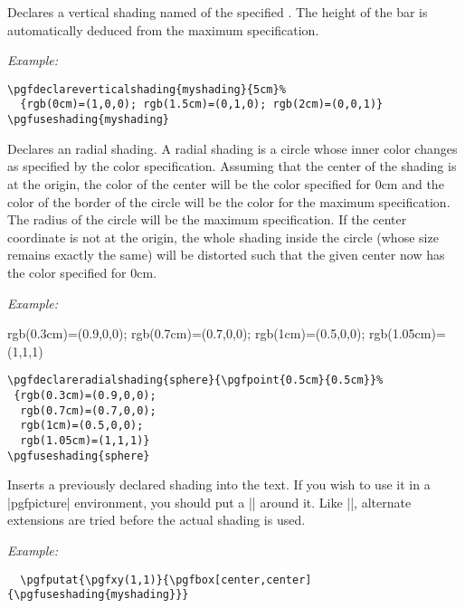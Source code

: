 \documentclass{ltxdoc}
\def\example{\par\smallskip\noindent\textit{Example: }}
\begin{document}
\begin{command}{\pgfdeclareverticalshading{}}
   Declares a vertical shading named  of the
   specified . The height of the bar is automatically
   deduced from the maximum specification.
  \example


\begin{verbatim}
\pgfdeclareverticalshading{myshading}{5cm}%
  {rgb(0cm)=(1,0,0); rgb(1.5cm)=(0,1,0); rgb(2cm)=(0,0,1)}
\pgfuseshading{myshading}
\end{verbatim}
\end{command}


\begin{command}{\pgfdeclareradialshading{}}
  Declares an radial shading. A radial shading is a circle whose inner
  color changes as specified by the color specification. Assuming that
  the center of the shading is at the origin, the color of the center
  will be the color specified for 0cm and the color of the border of
  the circle will be the color for the maximum specification. The
  radius of the circle will be the maximum specification. If the
  center coordinate is not at the origin, the whole shading inside the
  circle (whose size remains exactly the same) will be distorted such
  that the given center now has the color specified for 0cm.
  \example

%
 {rgb(0.3cm)=(0.9,0,0); rgb(0.7cm)=(0.7,0,0); rgb(1cm)=(0.5,0,0); rgb(1.05cm)=(1,1,1)}

\begin{verbatim}
\pgfdeclareradialshading{sphere}{\pgfpoint{0.5cm}{0.5cm}}%
 {rgb(0.3cm)=(0.9,0,0);
  rgb(0.7cm)=(0.7,0,0);
  rgb(1cm)=(0.5,0,0);
  rgb(1.05cm)=(1,1,1)}
\pgfuseshading{sphere}
\end{verbatim}
\end{command}

\begin{command}{\pgfuseshading{}}
  Inserts a previously declared shading into the text. If you wish to
  use it in a |pgfpicture| environment, you should put a |\pgfbox|
  around it. Like |\pgfuseimage|, alternate extensions are tried
  before the actual shading is used.
  \example

\begin{verbatim}
  \pgfputat{\pgfxy(1,1)}{\pgfbox[center,center]{\pgfuseshading{myshading}}}
\end{verbatim}
\end{command}
\end{document}
